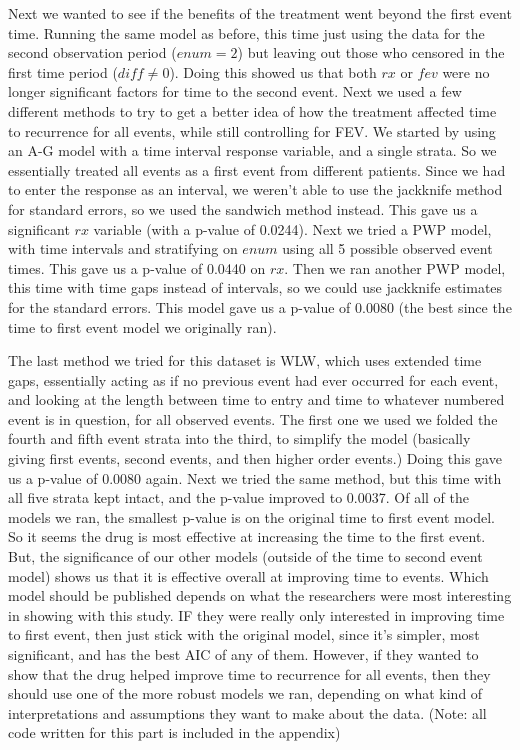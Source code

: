 \documentclass[11pt,letterpaper]{article}
\begin{document}
\par

Next we wanted to see if the benefits of the treatment went beyond the first event time. Running the same model as before, this time just using the data for the second observation period ($enum=2$) but leaving out those who censored in the first time period ($diff \neq 0$). Doing this showed us that both $rx$ or $fev$ were no longer significant factors for time to the second event. Next we used a few different methods to try to get a better idea of how the treatment affected time to recurrence for all events, while still controlling for FEV. We started by using an A-G model with a time interval response variable, and a single strata. So we essentially treated all events as a first event from different patients. Since we had to enter the response as an interval, we weren't able to use the jackknife method for standard errors, so we used the sandwich method instead. This gave us a significant $rx$ variable (with a p-value of 0.0244). Next we tried a PWP model, with time intervals and stratifying on $enum$ using all 5 possible observed event times. This gave us a p-value of 0.0440 on $rx$. Then we ran another PWP model, this time with time gaps instead of intervals, so we could use jackknife estimates for the standard errors. This model gave us a p-value of 0.0080 (the best since the time to first event model we originally ran).

\par

The last method we tried for this dataset is WLW, which uses extended time gaps, essentially acting as if no previous event had ever occurred for each event, and looking at the length between time to entry and time to whatever numbered event is in question, for all observed events. The first one we used we folded the fourth and fifth event strata into the third, to simplify the model (basically giving first events, second events, and then higher order events.) Doing this gave us a p-value of 0.0080 again. Next we tried the same method, but this time with all five strata kept intact, and the p-value improved to 0.0037. Of all of the models we ran, the smallest p-value is on the original time to first event model. So it seems the drug is most effective at increasing the time to the first event. But, the significance of our other models (outside of the time to second event model) shows us that it is effective overall at improving time to events. Which model should be published depends on what the researchers were most interesting in showing with this study. IF they were really only interested in improving time to first event, then just stick with the original model, since it's simpler, most significant, and has the best AIC of any of them. However, if they wanted to show that the drug helped improve time to recurrence for all events, then they should use one of the more robust models we ran, depending on what kind of interpretations and assumptions they want to make about the data. (Note: all code written for this part is included in the appendix)
\end{document}

